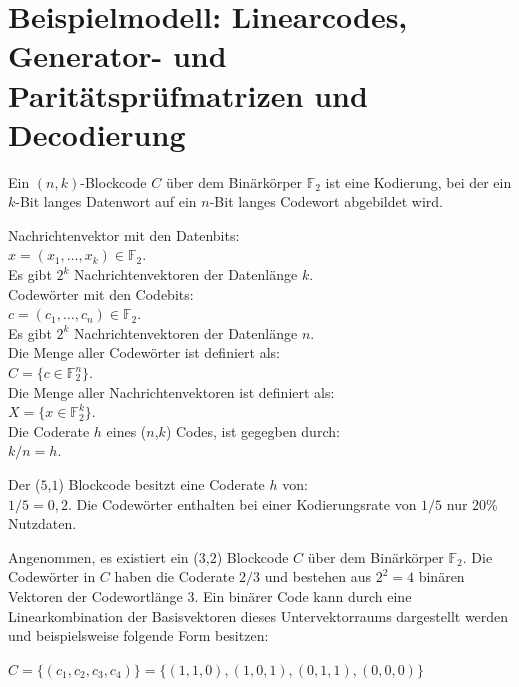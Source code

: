 \section{Beispielmodell: Linearcodes, Generator- und Paritätsprüfmatrizen und Decodierung} 


\begin{definition}[Blockcodes]
    Ein \((n, k)\)-Blockcode \(C\) über dem Binärkörper \(\mathbb{F}_{2}\) ist eine Kodierung, bei der ein \(k\)-Bit langes Datenwort auf ein \(n\)-Bit langes Codewort abgebildet wird.
    
    Nachrichtenvektor mit den Datenbits:\\
    \(
    x = (x_1, \ldots, x_k) \in \mathbb{F}_{2}
    \).\\
    Es gibt \(2^k\) Nachrichtenvektoren der Datenlänge \(k\).\\
    
    Codewörter mit den Codebits:\\
    \(
    c = (c_1, \ldots, c_n) \in \mathbb{F}_{2}
    \).\\
    Es gibt \(2^k\) Nachrichtenvektoren der Datenlänge \(n\).\\
    
    Die Menge aller Codewörter ist definiert als:\\
    \(
    C = \{c \in \mathbb{F}_{2}^n\}
    \).\\

    Die Menge aller Nachrichtenvektoren ist definiert als:\\
    \(
    X = \{x \in \mathbb{F}_{2}^k\}
    \).\\

    Die Coderate \(h\) eines (\(n\),\(k\)) Codes, ist gegegben durch:\\
    \(
    k/n = h
    \).
\end{definition}
    
\begin{Beispiel}[Coderate]
    Der (\(5\),\(1\)) Blockcode besitzt eine Coderate \(h\) von:\\
    \(
    1/5 = 0,2
    \).
    Die Codewörter enthalten bei einer Kodierungsrate von $1/5$ nur $20\%$ Nutzdaten.\\
\end{Beispiel}
    
\begin{Beispiel}[Codewörter]
    Angenommen, es existiert ein (\(3\),\(2\)) Blockcode \(C\) über dem Binärkörper $\mathbb{F}_{2}$. Die Codewörter in \(C\) haben die Coderate $2/3$ und bestehen aus $2^2 = 4$ binären Vektoren der Codewortlänge $3$. Ein binärer Code kann durch eine Linearkombination der Basisvektoren dieses Untervektorraums dargestellt werden und beispielsweise folgende Form besitzen:
    
    $C = \{(c_1, c_2, c_3, c_4)\} = \{(1,1,0),(1,0,1),(0,1,1),(0,0,0)\}$
    \\
\end{Beispiel}
\pagebreak

